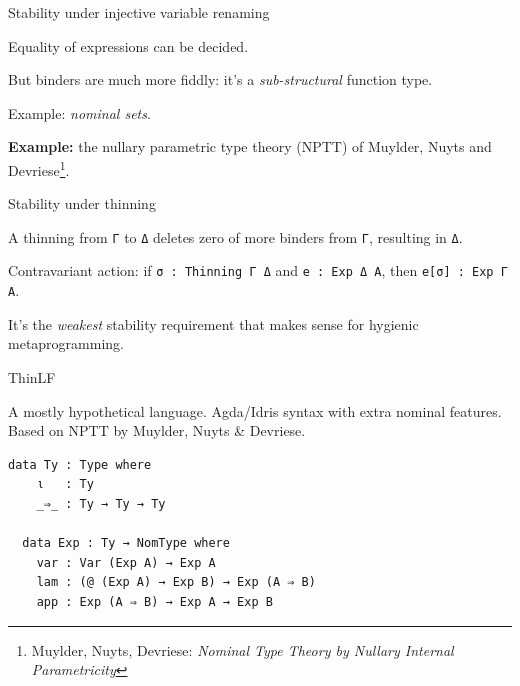 \documentclass[dvipsnames,aspectratio=169]{beamer}
\newcommand{\vsp}{\vspace{1em}}
\theoremstyle{remark}
\begin{document}
\begin{frame}[fragile]{Stability under injective variable renaming}

Equality of expressions can be decided.
\vsp

But binders are much more fiddly: it's a \emph{sub-structural} function type.
\vsp

Example: \emph{nominal sets}.
\vsp

\textbf{Example:} the nullary parametric type theory (NPTT) of Muylder, Nuyts and Devriese\footnote{Muylder, Nuyts, Devriese: \emph{Nominal Type Theory by Nullary Internal Parametricity}}.

\end{frame}


\begin{frame}[fragile]{Stability under thinning}

A thinning from \texttt{Γ} to \texttt{Δ} deletes zero of more binders from \texttt{Γ},
resulting in \texttt{Δ}.
\vsp

Contravariant action: if \texttt{σ : Thinning Γ Δ} and \texttt{e : Exp Δ A},
then \texttt{e[σ] : Exp Γ A}.

\vsp It's the \emph{weakest} stability requirement that makes sense for hygienic
metaprogramming.

\end{frame}


\begin{frame}[fragile]{ThinLF}

A mostly hypothetical language. Agda/Idris syntax with extra nominal
features. Based on NPTT by Muylder, Nuyts \& Devriese.

\vsp

\begin{Verbatim}[commandchars=\\\{\}]
  data Ty : Type where
    ι   : Ty
    _⇒_ : Ty → Ty → Ty

  data Exp : Ty → NomType where
    var : Var (Exp A) → Exp A
    lam : (@ (Exp A) → Exp B) → Exp (A ⇒ B)
    app : Exp (A ⇒ B) → Exp A → Exp B
\end{Verbatim} 

\end{frame}
\end{document}

